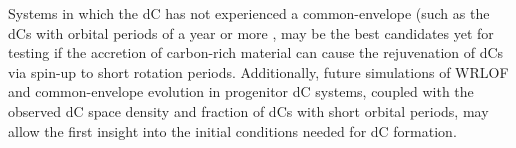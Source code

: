 \documentclass[twocolumn, tighten, times, astrosymb]{aastex631}
\begin{document}

Systems in which the dC has not experienced a common-envelope  (such as the dCs with orbital periods of a year or more \citep{Harris2018}, may be the best candidates yet for testing if the accretion of carbon-rich material can cause the rejuvenation of dCs via spin-up to short rotation periods. Additionally, future simulations of WRLOF and common-envelope evolution in progenitor dC systems, coupled with the observed dC space density and fraction of dCs with short orbital periods, may allow the first insight into the initial conditions needed for dC formation. 



\end{document}
